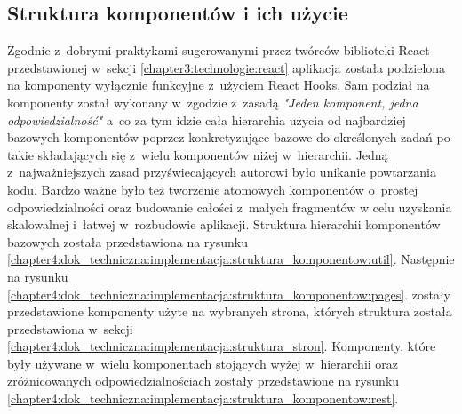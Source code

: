 \documentclass[../Kamil_Kowalewski_Main.tex]{subfiles}
\begin{document}
{{        \subsection{Struktura komponentów i ich użycie}
        \label{chapter4:dok_techniczna:implementacja:struktura_komponentow} {
            Zgodnie z~dobrymi praktykami sugerowanymi przez twórców biblioteki React
            przedstawionej w~sekcji \ref{chapter3:technologie:react} aplikacja została
            podzielona na komponenty wyłącznie funkcyjne z~użyciem React Hooks. Sam
            podział na komponenty został wykonany w~zgodzie z~zasadą
            \textit{"Jeden komponent, jedna odpowiedzialność"} a~co za tym idzie cała
            hierarchia użycia od najbardziej bazowych komponentów poprzez konkretyzujące
            bazowe do określonych zadań po takie składających się z~wielu komponentów
            niżej w~hierarchii. Jedną z~najważniejszych zasad przyświecających autorowi
            było unikanie powtarzania kodu. Bardzo ważne było też tworzenie atomowych komponentów
            o~prostej odpowiedzialności oraz budowanie całości z~małych fragmentów w celu
            uzyskania skalowalnej i~łatwej w~rozbudowie aplikacji. Struktura hierarchii
            komponentów bazowych została przedstawiona na rysunku
            \ref{chapter4:dok_techniczna:implementacja:struktura_komponentow:util}.
            Następnie na rysunku
            \ref{chapter4:dok_techniczna:implementacja:struktura_komponentow:pages}.
            zostały przedstawione komponenty użyte na wybranych strona, których
            struktura została przedstawiona w~sekcji
            \ref{chapter4:dok_techniczna:implementacja:struktura_stron}. Komponenty,
            które były używane w~wielu komponentach stojących wyżej w~hierarchii oraz
            zróżnicowanych odpowiedzialnościach zostały przedstawione na rysunku
            \ref{chapter4:dok_techniczna:implementacja:struktura_komponentow:rest}.

}}}
\end{document}

